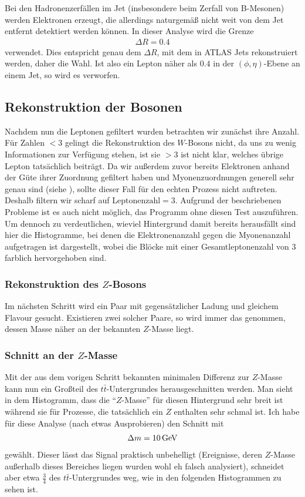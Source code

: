 Bei den Hadronenzerfällen im Jet (insbesondere beim Zerfall von B-Mesonen)
werden Elektronen erzeugt, die allerdings naturgemäß nicht weit von dem Jet
entfernt detektiert werden können. In dieser Analyse wird die Grenze
\begin{align}
  \Delta R = 0.4
\end{align}
verwendet. Dies entspricht genau dem $\Delta R$, mit dem in ATLAS Jets
rekonstruiert werden\cite{jet-recon}, daher die Wahl. Ist also ein Lepton näher
als $0.4$ in der $(\phi, \eta)$-Ebene an einem Jet, so wird es verworfen.


\subsection{Rekonstruktion der Bosonen}
Nachdem nun die Leptonen gefiltert wurden betrachten wir zunächst ihre Anzahl.
Für Zahlen $< 3$ gelingt die Rekonstruktion des $W$-Bosons nicht, da uns zu
wenig Informationen zur Verfügung stehen, ist sie $> 3$ ist nicht klar, welches
übrige Lepton tatsächlich beiträgt. Da wir außerdem zuvor bereits Elektronen
anhand der Güte ihrer Zuordnung gefiltert haben und Myonenzuordnungen generell
sehr genau sind (siehe \cite{myon-zuordnung}), sollte dieser Fall für den echten
Prozess nicht auftreten. Deshalb filtern wir scharf auf $\text{Leptonenzahl} =
3$. Aufgrund der beschriebenen Probleme ist es auch nicht möglich, das Programm
ohne diesen Test auszuführen. Um dennoch zu verdeutlichen, wieviel Hintergrund
damit bereits herausfällt sind hier die Histogramme, bei denen die
Elektronenanzahl gegen die Myonenanzahl aufgetragen ist dargestellt, wobei die
Blöcke mit einer Gesamtleptonenzahl von 3 farblich hervorgehoben sind.

\subsubsection{Rekonstruktion des $Z$-Bosons}
Im nächsten Schritt wird ein Paar mit gegensätzlicher Ladung und gleichem
Flavour gesucht. Existieren zwei solcher Paare, so wird immer das genommen,
dessen Masse näher an der bekannten $Z$-Masse liegt.


\subsubsection{Schnitt an der $Z$-Masse}
Mit der aus dem vorigen Schritt bekannten minimalen Differenz zur $Z$-Masse kann
nun ein Großteil des $t\bar{t}$-Untergrundes herausgeschnitten werden. Man sieht
in dem Histogramm, dass die "`$Z$-Masse"' für diesen Hintergrund sehr breit ist
während sie für Prozesse, die tatsächlich ein $Z$ enthalten sehr schmal ist. Ich
habe für diese Analyse (nach etwas Ausprobieren) den Schnitt mit
\begin{align}
  \Delta m = \unit[10]{GeV}
\end{align}
gewählt. Dieser lässt das Signal praktisch unbehelligt (Ereignisse, deren
$Z$-Masse außerhalb dieses Bereiches liegen wurden wohl eh falsch analysiert),
schneidet aber etwa $\frac{3}{4}$ des $t\bar{t}$-Untergrundes weg, wie in den
folgenden Histogrammen zu sehen ist.

